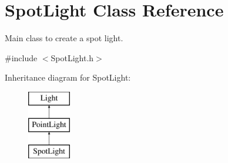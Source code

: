 \hypertarget{class_spot_light}{}\section{Spot\+Light Class Reference}
\label{class_spot_light}


Main class to create a spot light.  




{\ttfamily \#include $<$Spot\+Light.\+h$>$}

Inheritance diagram for Spot\+Light\+:\begin{figure}[H]
\begin{center}
\leavevmode
\includegraphics[height=3.000000cm]{class_spot_light}
\end{center}
\end{figure}

